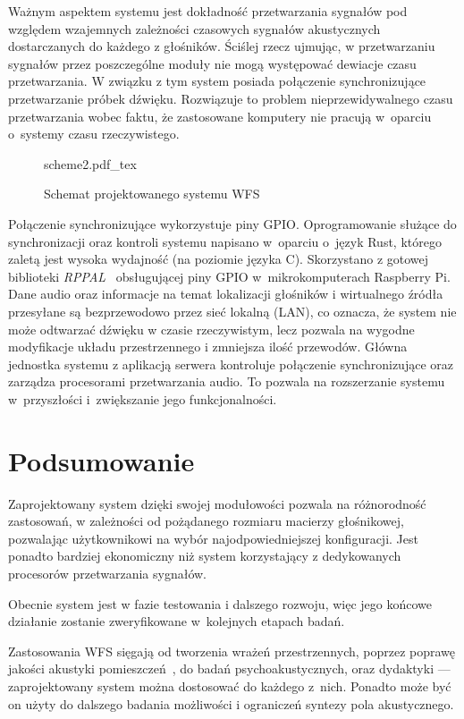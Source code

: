 \documentclass[10pt, a4paper]{article}
\let\Oldsection\section
\renewcommand{\section}{\FloatBarrier\Oldsection}
\begin{document}
Ważnym aspektem systemu jest dokładność przetwarzania sygnałów pod względem
wzajemnych zależności czasowych sygnałów akustycznych dostarczanych do każdego
z głośników.  Ściślej rzecz ujmując, w przetwarzaniu sygnałów przez
poszczególne moduły nie mogą występować dewiacje czasu przetwarzania. W związku
z tym system posiada połączenie synchronizujące przetwarzanie próbek dźwięku.
Rozwiązuje to problem nieprzewidywalnego czasu przetwarzania wobec faktu, że
zastosowane komputery nie pracują w~oparciu o~systemy czasu rzeczywistego.

\begin{figure}[H]
  \centering
  {scheme2.pdf_tex}
  \caption{Schemat projektowanego systemu WFS}
  \label{fig:schemat}
\end{figure}

Połączenie synchronizujące wykorzystuje piny GPIO. Oprogramowanie służące do
synchronizacji oraz kontroli systemu napisano w~oparciu o~język Rust, którego
zaletą jest wysoka wydajność (na poziomie języka C). Skorzystano z gotowej
biblioteki \emph{RPPAL}~\cite{RPPAL} obsługującej piny GPIO w~mikrokomputerach
Raspberry Pi. Dane audio oraz informacje na temat lokalizacji głośników i
wirtualnego źródła przesyłane są bezprzewodowo przez sieć lokalną (LAN), co
oznacza, że system nie może odtwarzać dźwięku w czasie rzeczywistym, lecz
pozwala na wygodne modyfikacje układu przestrzennego i zmniejsza ilość
przewodów. Główna jednostka systemu z aplikacją serwera kontroluje połączenie
synchronizujące oraz zarządza procesorami przetwarzania audio. To pozwala na rozszerzanie
systemu w~przyszłości i~zwiększanie jego funkcjonalności.

\section{Podsumowanie}

Zaprojektowany system dzięki swojej modułowości pozwala na różnorodność
zastosowań, w zależności od pożądanego rozmiaru macierzy głośnikowej,
pozwalając użytkownikowi na wybór najodpowiedniejszej konfiguracji. Jest
ponadto bardziej ekonomiczny niż system korzystający z dedykowanych procesorów
przetwarzania sygnałów.

Obecnie system jest w fazie testowania i dalszego rozwoju, więc jego końcowe
działanie zostanie zweryfikowane w~kolejnych etapach badań.

Zastosowania WFS sięgają od tworzenia wrażeń przestrzennych, poprzez poprawę
jakości akustyki pomieszczeń~\cite{enhancement}, do badań psychoakustycznych,
oraz dydaktyki --- zaprojektowany system można dostosować do każdego z~nich.
Ponadto może być on użyty do dalszego badania możliwości i ograniczeń syntezy
pola akustycznego.

\printbibliography
\end{document}
